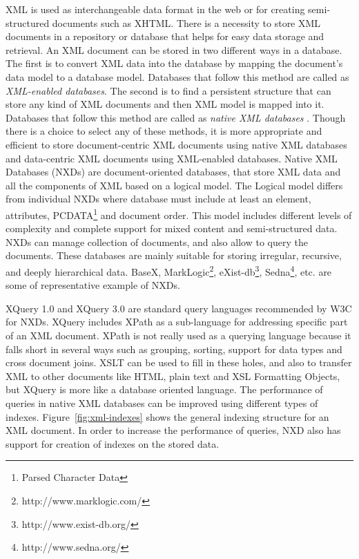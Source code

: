 \documentclass[a4paper,12pt]{book}
\begin{document}
  XML is used as interchangeable data format in the web or for creating semi-structured documents such as XHTML. There is a necessity to store XML documents in a repository or database that helps for easy data storage and retrieval. An XML document can be stored in two different ways in a database. The first is to convert XML data into the database by mapping the document's data model to a database model. Databases that follow this method are called as \textit{XML-enabled databases}. The second is to find a persistent structure that can store any kind of XML documents and then XML model is mapped into it. Databases that follow this method are called as \textit{native XML databases} \cite{pavlovic2007native}. Though there is a choice to select any of these methods, it is more appropriate and efficient to store document-centric XML documents using native XML databases and data-centric  XML documents using XML-enabled databases. Native XML Databases (NXDs) are document-oriented databases, that store XML data and all the components of XML based on a logical model. The Logical model differs from individual NXDs where database must include at least an element, attributes, PCDATA\footnote{Parsed Character Data} and document order. This model includes different levels of complexity and complete support for mixed content and semi-structured data. NXDs can manage collection of documents, and also allow to query the documents. These databases are mainly suitable for storing irregular, recursive, and deeply hierarchical data.  BaseX, MarkLogic\footnote{http://www.marklogic.com/}, eXist-db\footnote{http://www.exist-db.org/}, Sedna\footnote{http://www.sedna.org/}, etc. are some of representative example of NXDs. 
 \par 
 XQuery 1.0 and XQuery 3.0 are standard query languages recommended by W3C for NXDs. XQuery includes XPath as a sub-language for addressing specific part of an XML document. XPath is not really used as a querying language because it falls short in several ways such as grouping, sorting, support for data types and cross document joins. XSLT can be used to fill in these holes, and also to transfer XML to other documents like HTML, plain text and XSL Formatting Objects, but XQuery is more like a database oriented language.  The performance of queries in native XML databases can be improved using different types of indexes. Figure~\ref{fig:xml-indexes} shows the general indexing structure for an XML document. 
  In order to increase the performance of queries, NXD also has support for creation of indexes on the stored data\cite{pavlovic2007native}.
\end{document}
